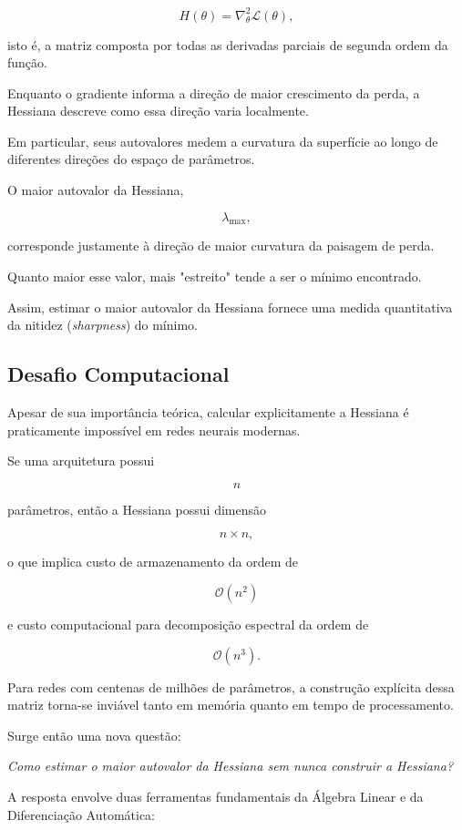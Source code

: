 \documentclass[12pt, a4paper]{article}
\begin{document}
\[
H(\theta)
=
\nabla_{\theta}^{2}\mathcal{L}(\theta),
\]

isto é, a matriz composta por todas as derivadas parciais de segunda ordem da função.

Enquanto o gradiente informa a direção de maior crescimento da perda, a Hessiana descreve como essa direção varia localmente.

Em particular, seus autovalores medem a curvatura da superfície ao longo de diferentes direções do espaço de parâmetros.

O maior autovalor da Hessiana,

\[
\lambda_{\max},
\]

corresponde justamente à direção de maior curvatura da paisagem de perda.

Quanto maior esse valor, mais "estreito" tende a ser o mínimo encontrado.

Assim, estimar o maior autovalor da Hessiana fornece uma medida quantitativa da nitidez (\textit{sharpness}) do mínimo.

\subsection{Desafio Computacional}

Apesar de sua importância teórica, calcular explicitamente a Hessiana é praticamente impossível em redes neurais modernas.

Se uma arquitetura possui

\[
n
\]

parâmetros, então a Hessiana possui dimensão

\[
n \times n,
\]

o que implica custo de armazenamento da ordem de

\[
\mathcal{O}(n^{2})
\]

e custo computacional para decomposição espectral da ordem de

\[
\mathcal{O}(n^{3}).
\]

Para redes com centenas de milhões de parâmetros, a construção explícita dessa matriz torna-se inviável tanto em memória quanto em tempo de processamento.

Surge então uma nova questão:

\begin{center}
\textit{Como estimar o maior autovalor da Hessiana sem nunca construir a Hessiana?}
\end{center}

A resposta envolve duas ferramentas fundamentais da Álgebra Linear e da Diferenciação Automática:
\end{document}
